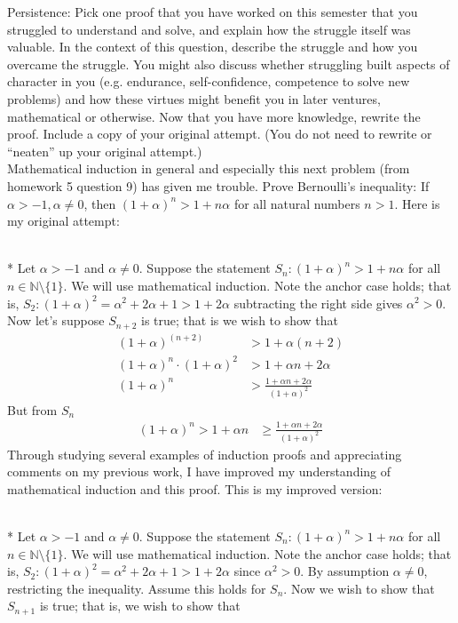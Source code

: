 \documentclass[10pt]{article}
\makeatletter
\newcommand{\N}{\mathbb{N}}
\newcommand{\al}{\alpha}
\newenvironment{question}[2][Question]{\begin{trivlist}
\item[\hskip \labelsep {\bfseries #1}\hskip \labelsep {\bfseries #2.}]}{\end{trivlist}}
\renewenvironment{proof}[1][\proofname]{\par
\pushQED{\qed}
\normalfont \topsep6\p@\@plus6\p@\relax
\trivlist
\item[\hskip\labelsep\itshape#1\@addpunct{.}]\mbox{}\\*}{\popQED\endtrivlist\@endpefalse}
\makeatother
\begin{document}
\newpage

\begin{question}{7}
Persistence: Pick one proof that you have worked on this semester that you struggled to understand and solve, and explain how the struggle itself was valuable. In the context of this question, describe the struggle and how you overcame the struggle. You might also discuss whether struggling built aspects of character in you (e.g. endurance, self-confidence, competence to solve new problems) and how these virtues might benefit you in later ventures, mathematical or otherwise. Now that you have more knowledge, rewrite the proof. Include a copy of your original attempt. (You do not need to rewrite or “neaten” up your original attempt.)\\

Mathematical induction in general and especially this next problem (from homework 5 question 9) has given me trouble. Prove Bernoulli's inequality: If $ \al > -1, \al \neq 0$, then $(1 + \al )^n > 1 + n \al$ for all natural numbers $n> 1$. Here is my original attempt:
    \begin{proof}
        Let $\al > -1$ and $\al \neq 0$. Suppose the statement $S_n: (1 + \al )^n > 1 + n \al$ for all $n \in \N \setminus \{1\}$. We will use mathematical induction. Note the anchor case holds; that is, $S_2: (1+ \al)^2 = \al^2 +2\al + 1> 1 + 2 \al$ subtracting the right side gives $\al^2 > 0$. Now let's suppose $S_{n+2}$ is true; that is we wish to show that
        \begin{align*}
            (1 + \al )^{(n+2)}                  & > 1 + \al (n+2)                           \\
            (1 + \al )^{n} \cdot (1 + \al )^{2} & > 1 + \al n+ 2 \al                        \\
            (1 + \al )^{n}                      & > \frac{1 + \al n+ 2 \al}{(1 + \al )^{2}}
        \end{align*}
        But from $S_n$
        \begin{align*}
            (1 + \al )^{n}  > 1+ \al n & \ge \frac{1 + \al n+ 2 \al}{(1 + \al )^{2}}
        \end{align*}
	\end{proof} \noindent
Through studying several examples of induction proofs and appreciating comments on my previous work, I have improved my understanding of mathematical induction and this proof. This is my improved version: 
\begin{proof}
	Let $\al > -1$ and $\al \neq 0$. Suppose the statement $S_n: (1 + \al )^n > 1 + n \al$ for all $n \in \N \setminus \{1\}$. We will use mathematical induction. Note the anchor case holds; that is, $S_2: (1+ \al)^2 = \al^2 +2\al + 1> 1 + 2 \al$ since $\al^2 > 0$. By assumption $\al \neq 0$, restricting the inequality. Assume this holds for $S_n$. Now we wish to show that $S_{n+1}$ is true; that is, we wish to show that

\end{proof}
\end{question}
\end{document}
